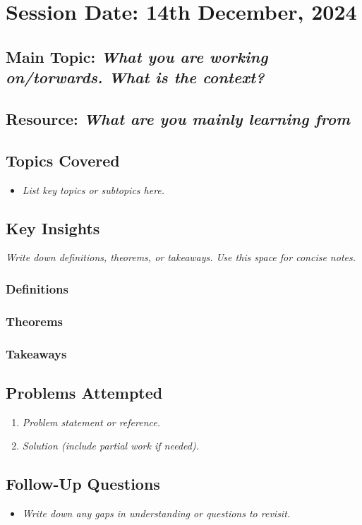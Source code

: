 \section{Session Date: 14th December, 2024}
\subsection*{Main Topic: \textit{What you are working on/torwards. What is the context?}}
\subsection*{Resource: \textit{What are you mainly learning from}}
\subsection*{Topics Covered}
\begin{itemize}
    \item \textit{List key topics or subtopics here.} 
\end{itemize}

\subsection*{Key Insights}
\textit{Write down definitions, theorems, or takeaways. Use this space for concise notes.}
\subsubsection*{Definitions} 
\subsubsection*{Theorems}
\subsubsection*{Takeaways}

\subsection*{Problems Attempted}
\begin{enumerate}
    \item \textit{Problem statement or reference.}
    \item \textit{Solution (include partial work if needed).}
\end{enumerate}

\subsection*{Follow-Up Questions}
\begin{itemize}
    \item \textit{Write down any gaps in understanding or questions to revisit.}
\end{itemize}
